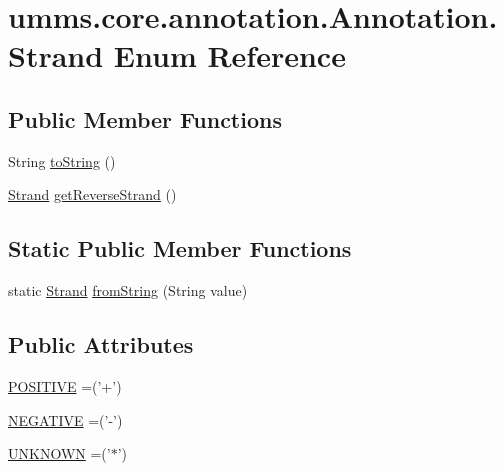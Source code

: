 \hypertarget{enumumms_1_1core_1_1annotation_1_1_annotation_1_1_strand}{\section{umms.\+core.\+annotation.\+Annotation.\+Strand Enum Reference}
\label{enumumms_1_1core_1_1annotation_1_1_annotation_1_1_strand}
}
\subsection*{Public Member Functions}
\begin{DoxyCompactItemize}
\item 
String \hyperlink{enumumms_1_1core_1_1annotation_1_1_annotation_1_1_strand_a6fe0ec3b527f48ccfe8ec873639f1109}{to\+String} ()
\item 
\hyperlink{enumumms_1_1core_1_1annotation_1_1_annotation_1_1_strand}{Strand} \hyperlink{enumumms_1_1core_1_1annotation_1_1_annotation_1_1_strand_adbacee1553c65383a56cdb22a22d74ad}{get\+Reverse\+Strand} ()
\end{DoxyCompactItemize}
\subsection*{Static Public Member Functions}
\begin{DoxyCompactItemize}
\item 
static \hyperlink{enumumms_1_1core_1_1annotation_1_1_annotation_1_1_strand}{Strand} \hyperlink{enumumms_1_1core_1_1annotation_1_1_annotation_1_1_strand_a3fbfdedde65fd959e865edef45892edd}{from\+String} (String value)
\end{DoxyCompactItemize}
\subsection*{Public Attributes}
\begin{DoxyCompactItemize}
\item 
\hyperlink{enumumms_1_1core_1_1annotation_1_1_annotation_1_1_strand_abfdcbea1d9b4e07f252c332486b96eed}{P\+O\+S\+I\+T\+I\+V\+E} =('+')
\item 
\hyperlink{enumumms_1_1core_1_1annotation_1_1_annotation_1_1_strand_a2b67589c3337d7e5628cb7f6af610f36}{N\+E\+G\+A\+T\+I\+V\+E} =('-\/')
\item 
\hyperlink{enumumms_1_1core_1_1annotation_1_1_annotation_1_1_strand_a2f9cd36f5078c72c6447f8d7b062a22e}{U\+N\+K\+N\+O\+W\+N} =('$\ast$')
\end{DoxyCompactItemize}


